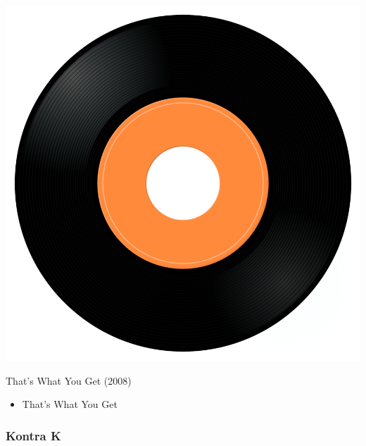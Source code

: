 \begin{minipage}[t]{0.25\textwidth}\vspace{0pt}
\captionsetup{type=figure}
\includegraphics[width=\textwidth]{Images/cover.png}
\caption*{That's What You Get (2008)}
\end{minipage}
\begin{minipage}[t]{0.25\textwidth}\vspace{0pt}
\begin{itemize}[nosep,leftmargin=1em,labelwidth=*,align=left]
	\setlength{\itemsep}{0pt}
	\item That’s What You Get
\end{itemize}
\end{minipage}

\subsubsection{Kontra K}

